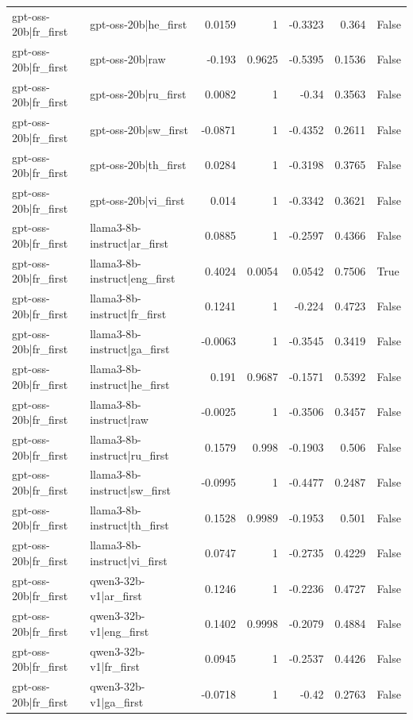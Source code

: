 \begin{table}
\begin{tabular}{l l r r r r l}
gpt-oss-20b|fr_first & gpt-oss-20b|he_first & 0.0159 & 1 & -0.3323 & 0.364 & False \\
gpt-oss-20b|fr_first & gpt-oss-20b|raw & -0.193 & 0.9625 & -0.5395 & 0.1536 & False \\
gpt-oss-20b|fr_first & gpt-oss-20b|ru_first & 0.0082 & 1 & -0.34 & 0.3563 & False \\
gpt-oss-20b|fr_first & gpt-oss-20b|sw_first & -0.0871 & 1 & -0.4352 & 0.2611 & False \\
gpt-oss-20b|fr_first & gpt-oss-20b|th_first & 0.0284 & 1 & -0.3198 & 0.3765 & False \\
gpt-oss-20b|fr_first & gpt-oss-20b|vi_first & 0.014 & 1 & -0.3342 & 0.3621 & False \\
gpt-oss-20b|fr_first & llama3-8b-instruct|ar_first & 0.0885 & 1 & -0.2597 & 0.4366 & False \\
gpt-oss-20b|fr_first & llama3-8b-instruct|eng_first & 0.4024 & 0.0054 & 0.0542 & 0.7506 & True \\
gpt-oss-20b|fr_first & llama3-8b-instruct|fr_first & 0.1241 & 1 & -0.224 & 0.4723 & False \\
gpt-oss-20b|fr_first & llama3-8b-instruct|ga_first & -0.0063 & 1 & -0.3545 & 0.3419 & False \\
gpt-oss-20b|fr_first & llama3-8b-instruct|he_first & 0.191 & 0.9687 & -0.1571 & 0.5392 & False \\
gpt-oss-20b|fr_first & llama3-8b-instruct|raw & -0.0025 & 1 & -0.3506 & 0.3457 & False \\
gpt-oss-20b|fr_first & llama3-8b-instruct|ru_first & 0.1579 & 0.998 & -0.1903 & 0.506 & False \\
gpt-oss-20b|fr_first & llama3-8b-instruct|sw_first & -0.0995 & 1 & -0.4477 & 0.2487 & False \\
gpt-oss-20b|fr_first & llama3-8b-instruct|th_first & 0.1528 & 0.9989 & -0.1953 & 0.501 & False \\
gpt-oss-20b|fr_first & llama3-8b-instruct|vi_first & 0.0747 & 1 & -0.2735 & 0.4229 & False \\
gpt-oss-20b|fr_first & qwen3-32b-v1|ar_first & 0.1246 & 1 & -0.2236 & 0.4727 & False \\
gpt-oss-20b|fr_first & qwen3-32b-v1|eng_first & 0.1402 & 0.9998 & -0.2079 & 0.4884 & False \\
gpt-oss-20b|fr_first & qwen3-32b-v1|fr_first & 0.0945 & 1 & -0.2537 & 0.4426 & False \\
gpt-oss-20b|fr_first & qwen3-32b-v1|ga_first & -0.0718 & 1 & -0.42 & 0.2763 & False \\

\end{tabular}
\end{table}
